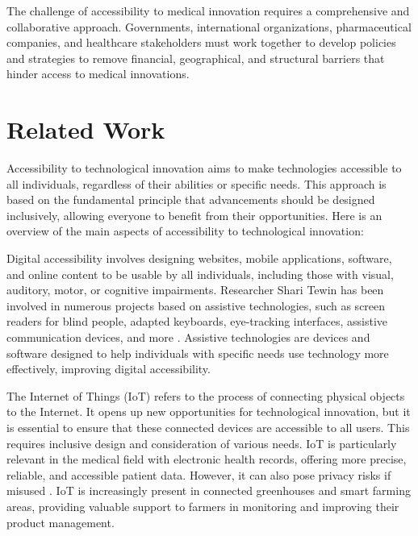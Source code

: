 The challenge of accessibility to medical innovation requires a comprehensive and collaborative approach. Governments, international organizations, pharmaceutical companies, and healthcare stakeholders must work together to develop policies and strategies to remove financial, geographical, and structural barriers that hinder access to medical innovations.

\section{Related Work}
Accessibility to technological innovation aims to make technologies accessible to all individuals, regardless of their abilities or specific needs. This approach is based on the fundamental principle that advancements should be designed inclusively, allowing everyone to benefit from their opportunities. Here is an overview of the main aspects of accessibility to technological innovation:

Digital accessibility involves designing websites, mobile applications, software, and online content to be usable by all individuals, including those with visual, auditory, motor, or cognitive impairments. Researcher Shari Tewin has been involved in numerous projects based on assistive technologies, such as screen readers for blind people, adapted keyboards, eye-tracking interfaces, assistive communication devices, and more \cite{keates_effect_2005}\cite{trewin_automating_2003}\cite{noauthor_developing_nodate}\cite{noauthor_physical_nodate}. Assistive technologies are devices and software designed to help individuals with specific needs use technology more effectively, improving digital accessibility.

The Internet of Things (IoT) refers to the process of connecting physical objects to the Internet. It opens up new opportunities for technological innovation, but it is essential to ensure that these connected devices are accessible to all users. This requires inclusive design and consideration of various needs. IoT is particularly relevant in the medical field with electronic health records, offering more precise, reliable, and accessible patient data. However, it can also pose privacy risks if misused \cite{noauthor_sensitive_nodate}. IoT is increasingly present in connected greenhouses\cite{vatari_green_2016} and smart farming\cite{kamilaris_agri-iot_2016}\cite{noauthor_les_nodate} areas, providing valuable support to farmers in monitoring and improving their product management.

